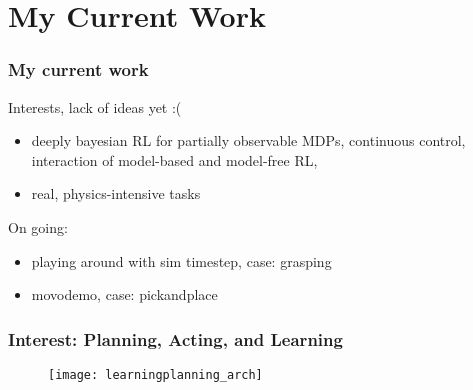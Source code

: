 \section{My Current Work}

\begin{frame}
\frametitle{My current work}

Interests, lack of ideas yet :(
\begin{itemize}
  \item deeply bayesian RL for partially observable MDPs,
  continuous control, interaction of model-based and model-free RL,
  \item real, physics-intensive tasks
\end{itemize}

On going:
\begin{itemize}
  \item playing around with sim timestep, case: grasping
  \item movodemo, case: pickandplace
\end{itemize}

\end{frame}

\begin{frame}
\frametitle{Interest: Planning, Acting, and Learning}
\begin{figure}
    \centering
    \texttt{[image: learningplanning\_arch]}
\end{figure}
\end{frame}


